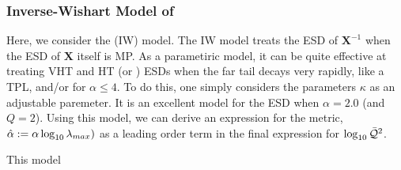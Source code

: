 




\subsubsection{Inverse-Wishart Model of \IdealLearning}

Here, we consider the \InverseWishart (IW) model.
The IW model treats the ESD of $\mathbf{X}^{-1}$ when the ESD of $\mathbf{X}$ itself is MP.
As a parametiric model, it can be quite effective at treating VHT and HT (or \FatTailed) ESDs when the far tail decays very rapidly, like a TPL, and/or for $\alpha\le 4$.
To do this, one simply considers the parameters $\kappa$ as an adjustable paremeter.
%
It is an excellent model for the ESD when $\alpha=2.0$ (and $Q=2$).
Using this model, we can derive an expression for the \HTSR \ALPHAHAT \LayerQuality metric,
$\hat\alpha :=\alpha\log_{10}\lambda_{max})$ as a leading order term in the final expression for $\log_{10}\bar{\mathcal{Q}}^{2}$.

This model 


